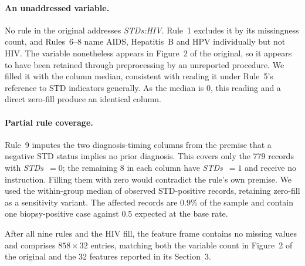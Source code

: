 \paragraph{An unaddressed variable.} No rule in the original addresses
\emph{STDs:HIV}. Rule~1 excludes it by its missingness count, and Rules~6--8
name AIDS, Hepatitis~B and HPV individually but not HIV. The variable
nonetheless appears in Figure~2 of the original, so it appears to have been
retained through preprocessing by an unreported procedure. We filled it with
the column median, consistent with reading it under Rule~5's reference to STD
indicators generally. As the median is $0$, this reading and a direct zero-fill
produce an identical column.

\paragraph{Partial rule coverage.} Rule~9 imputes the two diagnosis-timing
columns from the premise that a negative STD status implies no prior diagnosis.
This covers only the 779 records with \emph{STDs}~$=0$; the remaining 8 in each
column have \emph{STDs}~$=1$ and receive no instruction. Filling them with zero
would contradict the rule's own premise. We used the within-group median of
observed STD-positive records, retaining zero-fill as a sensitivity variant.
The affected records are 0.9\% of the sample and contain one biopsy-positive
case against 0.5 expected at the base rate.

After all nine rules and the HIV fill, the feature frame contains no missing
values and comprises $858 \times 32$ entries, matching both the variable count
in Figure~2 of the original and the 32 features reported in its Section~3.

